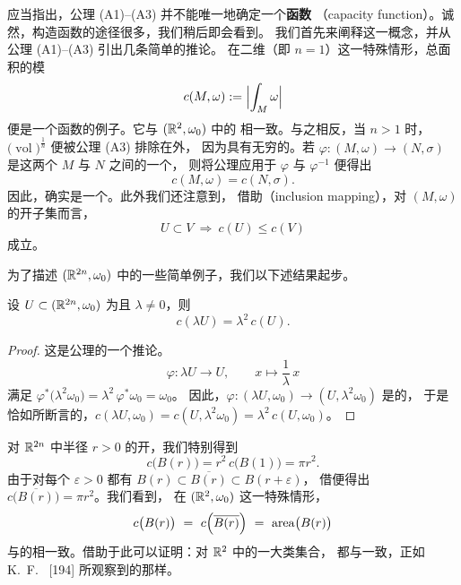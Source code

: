 应当指出，公理 (A1)--(A3) 并不能唯一地确定一个\textbf{\trCapacity{}函数}%
（capacity function）。诚然，构造\trCapacity{}函数的途径很多，我们稍后即会看到。%
我们首先来阐释这一概念，并从公理 (A1)--(A3) 引出几条简单的推论。%
在二维\trSymplecticManifold（即 $n=1$）这一特殊情形，总面积的模
\[
c(M,\omega):=\Bigl|\int_{M}\omega\Bigr|
\]
便是一个\trSymplecticCapacity{}函数的例子。它与 $(\mathbb{R}^{2},\omega_0)$ 中的%
\trLebesgue{}\trMeasure{}相一致。与之相反，当 $n>1$ 时，\trSymplecticInvariant{}%
$\bigl(\operatorname{vol}\bigr)^{\frac{1}{n}}$ 便被公理 (A3) 排除在外，%
因为\trCylinder{}具有无穷的\trVolume。若 $\varphi:(M,\omega)\to(N,\sigma)$ 是这两个%
\trManifold{} $M$ 与 $N$ 之间的一个\trSymplecticDiffeomorphism，%
则将\trMonotonicity{}公理应用于 $\varphi$ 与 $\varphi^{-1}$ 便得出
\[
c(M,\omega)=c(N,\sigma).
\]
因此，\trCapacity{}确实是一个\trSymplecticInvariant。此外我们还注意到，%
借助\textbf{\trInclusionMapping}（inclusion mapping），对 $(M,\omega)$ 的开子集而言，\trMonotonicity
\[
U\subset V\ \Longrightarrow\ c(U)\leq c(V)
\]
成立。

为了描述 $(\mathbb{R}^{2n},\omega_0)$ 中的一些简单例子，我们以下述结果起步。

\begin{lemma}\label{lem:scaling}
设 $U\subset(\mathbb{R}^{2n},\omega_0)$ 为\trOpenSet{}且 $\lambda\neq0$，则
\[
c(\lambda U)=\lambda^{2}\,c(U).
\]
\end{lemma}

\begin{proof}
这是\trConformality{}公理的一个推论。\trDiffeomorphism
\[
\varphi:\lambda U\to U,\qquad x\mapsto\frac{1}{\lambda}\,x
\]
满足 $\varphi^{*}\bigl(\lambda^{2}\omega_0\bigr)=\lambda^{2}\,\varphi^{*}\omega_0=\omega_0$。%
因此，$\varphi:(\lambda U,\omega_0)\to(U,\lambda^{2}\omega_0)$ 是\trSymplectic{}的，%
于是恰如所断言的，$c(\lambda U,\omega_0)=c(U,\lambda^{2}\omega_0)=\lambda^{2}\,c(U,\omega_0)$。
\end{proof}

对 $\mathbb{R}^{2n}$ 中半径 $r>0$ 的开\trBall，我们特别得到
\begin{equation}\label{eq:ball-capacity}
c\bigl(B(r)\bigr)=r^{2}\,c\bigl(B(1)\bigr)=\pi r^{2}.
\end{equation}
由于对每个 $\varepsilon>0$ 都有 $B(r)\subset\overline{B(r)}\subset B(r+\varepsilon)$，%
借\trMonotonicity{}便得出 $c\bigl(\overline{B(r)}\bigr)=\pi r^{2}$。我们看到，%
在 $(\mathbb{R}^{2},\omega_0)$ 这一特殊情形，
\[
c\bigl(B(r)\bigr)\ =\ c\Bigl(\overline{B(r)}\Bigr)\ =\ \operatorname{area}\bigl(B(r)\bigr)
\]
与\trDisc{}的\trLebesgue{}\trMeasure{}相一致。借助于此可以证明：对 $\mathbb{R}^{2}$ 中的一大类集合，%
\trCapacity{}都与\trLebesgue{}\trMeasure{}一致，正如 K.~F.~\trSiburg{} [194]%
所观察到的那样。

